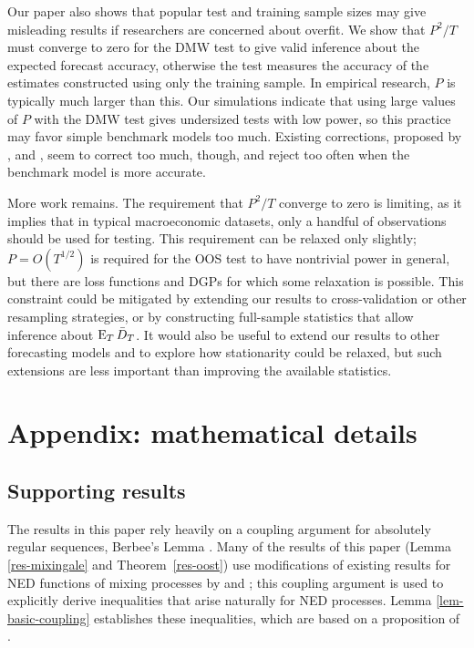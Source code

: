 \documentclass[12pt]{article}
\begin{document}
Our paper also shows that popular test and training sample sizes may
give misleading results if researchers are concerned about overfit.
We show that $P^2/T$ must converge to zero for the DMW test to give
valid inference about the expected forecast accuracy, otherwise the
test measures the accuracy of the estimates constructed using only the
training sample.  In empirical research, $P$ is typically much larger
than this.  Our simulations indicate that using large values of $P$
with the DMW test gives undersized tests with low power, so this
practice may favor simple benchmark models too much.  Existing
corrections, proposed by \citet{ClM:01,ClM:05}, \citet{Mcc:07} and
\citet{ClW:06,ClW:07}, seem to correct too much, though, and reject
too often when the benchmark model is more accurate.

More work remains.  The requirement that $P^2/T$ converge to zero is
limiting, as it implies that in typical macroeconomic datasets, only a
handful of observations should be used for testing.  This requirement
can be relaxed only slightly; $P = O(T^{1/2})$ is required for the
OOS test to have nontrivial power in general, but there are loss
functions and DGPs for which some relaxation is possible.  This
constraint could be mitigated by extending our results to
cross-validation or other resampling strategies, or by constructing
full-sample statistics that allow inference about $\operatorname{E}_T \bar{D}_T$.
It would also be useful to extend our results to other forecasting
models and to explore how stationarity could be relaxed, but such
extensions are less important than improving the available statistics.

\appendix
\section*{Appendix: mathematical details}
\setcounter{section}{1}
\setcounter{lem}{0}
\renewcommand{\thelem}{A\arabic{lem}}

\subsection*{Supporting results}
The results in this paper rely heavily on a coupling argument for
absolutely regular sequences, Berbee's Lemma \citep{Ber:79}.  Many of
the results of this paper (Lemma \ref{res-mixingale} and
Theorem~\ref{res-oost}) use modifications of existing results
for NED functions of mixing processes by \citet{Jon:97} and
\citet{JoD:00}; this coupling argument is used to explicitly derive
inequalities that arise naturally for NED processes.  Lemma
\ref{lem-basic-coupling} establishes these inequalities, which are
based on a proposition of \citet{MeP:02}.
\end{document}
